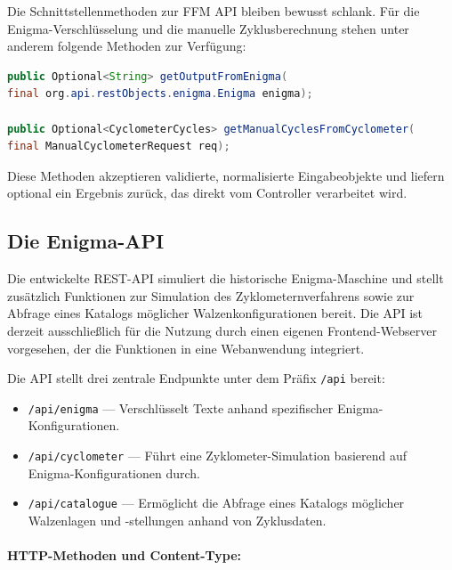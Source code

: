 \documentclass[12pt, ngerman, a4paper, numbers=noenddot]{article}
\begin{document}
Die Schnittstellenmethoden zur FFM API bleiben bewusst schlank. Für die Enigma-Verschlüsselung und die manuelle Zyklusberechnung stehen unter anderem folgende Methoden zur Verfügung:

\begin{lstlisting}[language=Java, caption={Schnittstellenmethoden zur nativen FFM API}, label=lst:native-methods]
public Optional<String> getOutputFromEnigma(
final org.api.restObjects.enigma.Enigma enigma);

public Optional<CyclometerCycles> getManualCyclesFromCyclometer(
final ManualCyclometerRequest req);
\end{lstlisting}

Diese Methoden akzeptieren validierte, normalisierte Eingabeobjekte und liefern optional ein Ergebnis zurück, das direkt vom Controller verarbeitet wird.





\subsection{Die Enigma-API}
\label{subsec:enigma-api}
Die entwickelte REST-API simuliert die historische Enigma-Maschine und stellt zusätzlich Funktionen zur Simulation des Zyklometernverfahrens sowie zur Abfrage eines Katalogs möglicher Walzenkonfigurationen bereit. Die API ist derzeit ausschließlich für die Nutzung durch einen eigenen Frontend-Webserver vorgesehen, der die Funktionen in eine Webanwendung integriert.

Die API stellt drei zentrale Endpunkte unter dem Präfix \lstinline|/api| bereit:

\begin{itemize}
	\item \lstinline|/api/enigma| — Verschlüsselt Texte anhand spezifischer Enigma\hyp{}Konfigurationen.
	\item \lstinline|/api/cyclometer| — Führt eine Zyklometer-Simulation basierend auf Enigma\hyp{}Konfigurationen durch.
	\item \lstinline|/api/catalogue| — Ermöglicht die Abfrage eines Katalogs möglicher Walzenlagen und -stellungen anhand von Zyklusdaten.
\end{itemize}

\paragraph{HTTP-Methoden und Content-Type:}
\end{document}
